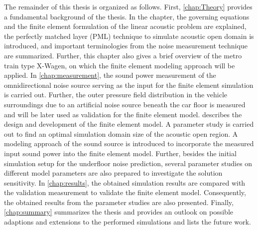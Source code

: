 The remainder of this thesis is organized as follows. First, \cref{chap:Theory} provides a fundamental background of the thesis. In the chapter, the governing equations and the finite element formulation of the linear acoustic problem are explained, the perfectly matched layer (PML) technique to simulate acoustic open domain is introduced, and important terminologies from the noise measurement technique are summarized. Further, this chapter also gives a brief overview of the metro train type X-Wagen, on which the finite element modeling approach will be applied. In \cref{chap:measurement}, the sound power measurement of the omnidirectional noise source serving as the input for the finite element simulation is carried out. Further, the outer pressure field distribution in the vehicle surroundings due to an artificial noise source beneath the car floor is measured and will be later used as validation for the finite element model.  describes the design and development of the finite element model. A parameter study is carried out to find an optimal simulation domain size of the acoustic open region. A modeling approach of the sound source is introduced to incorporate the measured input sound power into the finite element model. Further, besides the initial simulation setup for the underfloor noise prediction, several parameter studies on different model parameters are also prepared to investigate the solution sensitivity. In \cref{chap:results}, the obtained simulation results are compared with the validation measurement to validate the finite element model. Consequently, the obtained results from the parameter studies are also presented. Finally, \cref{chap:summary} summarizes the thesis and provides an outlook on possible adaptions and extensions to the performed simulations and lists the future work.
